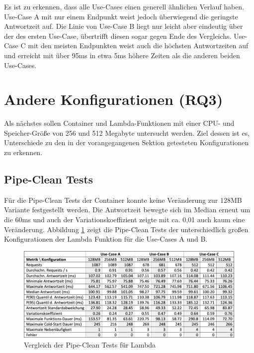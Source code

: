 Es ist zu erkennen, dass alle Use-Cases einen generell ähnlichen Verlauf haben. Use-Case A mit nur einem Endpunkt weist jedoch überwiegend die geringste Antwortzeit auf. Die Linie von Use-Case B liegt nur leicht aber eindeutig über der des ersten Use-Case, übertrifft diesen sogar gegen Ende des Vergleichs. Use-Case C mit den meisten Endpunkten weist auch die höchsten Antwortzeiten auf und erreicht mit über 95ms in etwa 5ms höhere Zeiten als die anderen beiden Use-Cases.  


\section{Andere Konfigurationen (RQ3)}
Als nächstes sollen Container und Lambda-Funktionen mit einer CPU- und Speicher-Größe von 256 und 512 Megabyte untersucht werden. Ziel dessen ist es, Unterschiede zu den in der vorangegangenen Sektion getesteten Konfigurationen zu erkennen.

\subsection{Pipe-Clean Tests}
Für die Pipe-Clean Tests der Container konnte keine Veränderung zur 128MB Variante festgestellt werden. Die Antwortzeit bewegte sich im Median erneut um die 60ms und auch der Variationskoeffizient zeigte mit ca. 0,01 auch kaum eine Veränderung.
Abbildung \ref{fig:pipe-comparison} zeigt die Pipe-Clean Tests der unterschiedlich großen Konfigurationen der Lambda Funktion für die Use-Cases A und B.

\begin{figure}[H]
    \includegraphics[width=\textwidth]{img/pipe-comparison.png}
    \caption[Vergleich der Pipe-Clean Tests für Lambda]{Vergleich der Pipe-Clean Tests für Lambda}
    \label{fig:pipe-comparison}
\end{figure}

